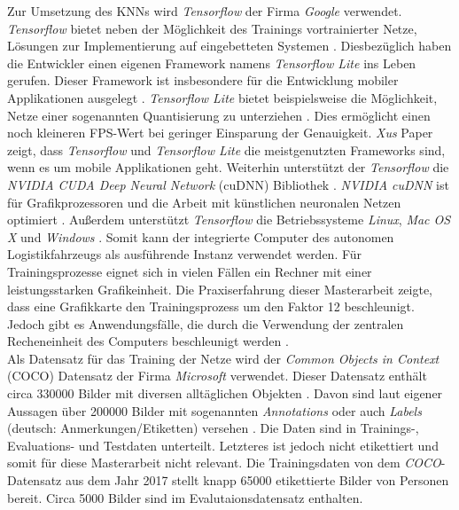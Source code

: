 		Zur Umsetzung des KNNs wird \textit{Tensorflow} der Firma \textit{Google} verwendet. \textit{Tensorflow} bietet neben der Möglichkeit des Trainings vortrainierter Netze, Lösungen zur Implementierung auf eingebetteten Systemen \cite{frameworks}. Diesbezüglich haben die Entwickler einen eigenen Framework namens \textit{Tensorflow Lite} ins Leben gerufen. Dieser Framework ist insbesondere für die Entwicklung mobiler Applikationen ausgelegt \cite{tflite}. \textit{Tensorflow Lite} bietet beispielsweise die Möglichkeit, Netze einer sogenannten Quantisierung zu unterziehen \cite{tflite}. Dies ermöglicht einen noch kleineren FPS-Wert bei geringer Einsparung der Genauigkeit. \textit{Xus} Paper zeigt, dass \textit{Tensorflow} und \textit{Tensorflow Lite} die meistgenutzten Frameworks sind, wenn es um mobile Applikationen geht. Weiterhin unterstützt der \textit{Tensorflow} die \textit{NVIDIA CUDA Deep Neural Network} (cuDNN) Bibliothek \cite{frameworks}. \textit{NVIDIA cuDNN} ist für Grafikprozessoren und die Arbeit mit künstlichen neuronalen Netzen optimiert \cite{frameworks}. Außerdem unterstützt \textit{Tensorflow} die Betriebssysteme \textit{Linux}, \textit{Mac OS X} und \textit{Windows} \cite{frameworks}. Somit kann der integrierte Computer des autonomen Logistikfahrzeugs als ausführende Instanz verwendet werden. Für Trainingsprozesse eignet sich in vielen Fällen ein Rechner mit einer leistungsstarken Grafikeinheit. Die Praxiserfahrung dieser Masterarbeit zeigte, dass eine Grafikkarte den Trainingsprozess um den Faktor 12 beschleunigt. Jedoch gibt es Anwendungsfälle, die durch die Verwendung der zentralen Recheneinheit des Computers beschleunigt werden \cite{cpugpu}. \\
		
		Als Datensatz für das Training der Netze wird der \textit{Common Objects in Context} (COCO) Datensatz der Firma \textit{Microsoft} verwendet. Dieser Datensatz enthält circa 330000 Bilder mit diversen alltäglichen Objekten \cite{coco, cocopaper}. Davon sind laut eigener Aussagen über 200000 Bilder mit sogenannten \textit{Annotations} oder auch \textit{Labels} (deutsch: Anmerkungen/Etiketten) versehen \cite{coco}. Die Daten sind in Trainings-, Evaluations- und Testdaten unterteilt. Letzteres ist jedoch nicht etikettiert und somit für diese Masterarbeit nicht relevant. Die Trainingsdaten von dem \textit{COCO}-Datensatz aus dem Jahr 2017 stellt knapp 65000 etikettierte Bilder von Personen bereit. Circa 5000 Bilder sind im Evalutaionsdatensatz enthalten.\\
		
